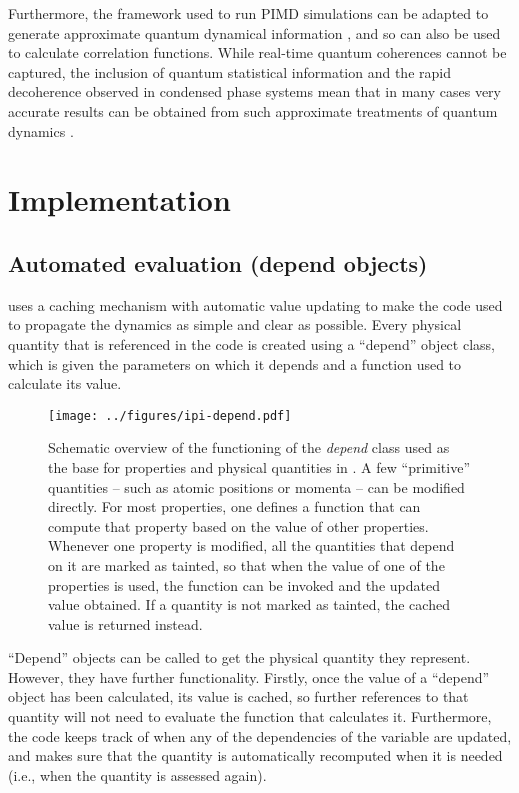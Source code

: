 \documentclass[11pt,english,fleqn]{report}
\begin{document}
Furthermore, the framework used to run PIMD simulations can be adapted
to generate approximate quantum dynamical information
\cite{cao-voth93jcp,cao-voth94jcp,crai-mano04jcp,braa-mano06jcp},
and so can also be used to calculate correlation functions. While
real-time quantum coherences cannot be captured, the inclusion
of quantum statistical information
and the rapid decoherence observed in condensed phase systems mean
that in many cases very accurate results can be obtained from such
approximate treatments of quantum dynamics \cite{habe+13arpc}.


\section{Implementation}


\subsection{Automated evaluation (depend objects)}

\ipi uses a caching mechanism with automatic value updating to make
the code used to propagate the dynamics as simple and clear as possible.
Every physical quantity that is referenced in the code is created
using a {}``depend'' object class, which is given the parameters
on which it depends and a function used to calculate its value.

\begin{figure}[hpbt]
\centering\texttt{[image: ../figures/ipi-depend.pdf]}
\caption{\label{fig:depend} Schematic overview of the functioning of the
\emph{depend} class used as the base for properties and physical quantities in \ipi{}.
A few ``primitive'' quantities -- such as atomic positions or momenta -- can be modified
directly. For most properties, one defines a function that can compute that property based on the
value of other properties. Whenever one property is modified, all the quantities that
depend on it are marked as tainted, so that when the value of one of the properties
is used, the function can be invoked and the updated value obtained. If a quantity
is not marked as tainted, the cached value is returned instead.
}
\end{figure}


{}``Depend'' objects can be called to get the physical quantity
they represent. However, they have further functionality. Firstly,
once the value of a {}``depend'' object has been calculated, its
value is cached, so further references to that quantity will not need
to evaluate the function that calculates it. Furthermore, the code
keeps track of when any of the dependencies of the variable are updated,
and makes sure that the quantity is automatically recomputed when
it is needed (i.e., when the quantity is assessed again).
\end{document}
